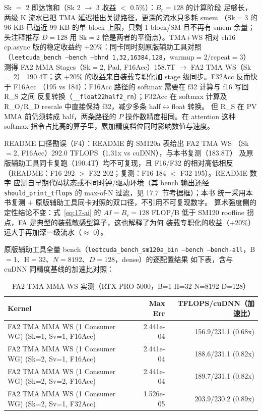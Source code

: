 Sk $=$ 2 即达饱和（Sk 2 $\to$ 3 收益 $<$ 0.5\%）：$B_r{=}128$ 的计算阶段
足够长，两级 K 流水已把 TMA 延迟推出关键路径，更深的流水只多耗 smem
（Sk$=$3 的 96 KB 已逼近 99 KB 的单 block 上限，只剩 1 block/SM 且不再有 smem 余量；
头注释推荐 $D{=}128$ 用 Sk$=$2 恰是两者的平衡点）。TMA+WS 相对 ch16 cp.async 版的稳定收益约
$+20\%$：同卡同时刻原版辅助工具对照
（\texttt{leetcuda\_\allowbreak{}bench --bench --bhnd 1,\allowbreak{}32,\allowbreak{}16384,\allowbreak{}128}，warmup$=$2/repeat$=$3）
测得 FA2 MMA Stages（Sk$=$2, Pad, F16Acc）158.7T $\to$ FA2 TMA WS（Sk$=$2）
190.4T；这 $+20\%$ 的收益来自装载专职化加 stage 级同步。F32Acc 反而快于 F16Acc
（195 vs 184）：F16Acc 路径的 softmax 需要在 f32 计算与 f16 写回 R\_S 之间
反复转换（\texttt{\_\allowbreak{}\_\allowbreak{}float22half2\_\allowbreak{}rn}）；F32Acc 在 softmax
计算及 R\_O/R\_D rescale 中直接保持 f32，减少多条 half$\leftrightarrow$float 转换。
但 R\_S 在 PV MMA 前仍须转成 half，两条路径的 $P$ 操作数精度相同。在 attention
这种 softmax 指令占比高的算子里，累加精度档位同时影响数值与速度。

README 口径勘误（F4）：README 的 SM120a 表给出 FA2 TMA WS
（Sk$=$2, F16Acc）292.0 TFLOPS（1.31x vs cuDNN），与本书复测（183.8T）
及原版辅助工具同卡复跑（190.4T）均不可复现，且 F16/F32 的相对高低相反
（README：F16 292 $>$ F32 202；复测：F16 184 $<$ F32 195）。README 数字
应测自早期代码状态或不同时钟/驱动环境（其 bench 输出还经
\texttt{should\_\allowbreak{}print\_\allowbreak{}tflops} 的 max-of-N 过滤，见 17.7~节考据框）；本书
统一采用本书复测 $+$ 原版辅助工具同卡对照的双口径，不引用不可复现数字。
算术强度侧的定性结论不变：式~\ref{eq:17-ai} 的 $AI = B_r = 128$ FLOP/B
低于 SM120 roofline 拐点，FA 是典型的装载敏感型算子，这也解释了为何
装载专职化的收益（$+20\%$）远大于再加深一级流水（$\approx$ 0）。

原版辅助工具全量 bench（\texttt{leetcuda\_\allowbreak{}bench\_\allowbreak{}sm120a\_\allowbreak{}bin --bench
--bench-all}，B$=$1、H$=$32、$N{=}8192$、$D{=}128$，dense）的逐配置结果
如下表，含与 cuDNN 同精度基线的加速比对照：

\begin{table}[H]
\centering
\caption{FA2 TMA MMA WS 实测（RTX PRO 5000，B=1 H=32 N=8192 D=128）}
\label{tab:ch17-perf}
\small
\setlength{\tabcolsep}{4pt}
\begin{tabular}{lrr}
\toprule
Kernel & Max Err & TFLOPS/cuDNN（加速比） \\
\midrule
{\footnotesize FA2 TMA MMA WS (1 Consumer WG) (Sk=1, Sv=1, F16Acc)} & 2.441e-04 & 156.9/231.1 (0.68x) \\
{\footnotesize FA2 TMA MMA WS (1 Consumer WG) (Sk=2, Sv=1, F16Acc)} & 2.441e-04 & 188.6/231.1 (0.82x) \\
{\footnotesize FA2 TMA MMA WS (1 Consumer WG) (Sk=2, Sv=2, F16Acc)} & 2.441e-04 & 189.7/231.1 (0.82x) \\
{\footnotesize FA2 TMA MMA WS (1 Consumer WG) (Sk=2, Sv=1, F32Acc)} & 1.526e-05 & 203.9/230.2 (0.89x) \\
\bottomrule
\end{tabular}
\end{table}

